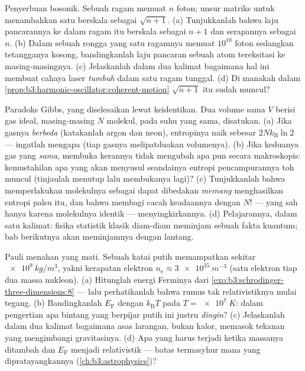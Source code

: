 \begin{exercise}[$\star\star$]\label{exo:b3:identical-particles:9}
Penyerbuan bosonik. Sebuah ragam memuat $n$ foton; unsur matriks untuk
menambahkan satu berskala sebagai $\sqrt{n+1}$. (a) Tunjukkanlah bahwa
laju pancarannya ke dalam ragam itu berskala sebagai $n + 1$ dan
serapannya sebagai $n$. (b) Dalam sebuah rongga yang satu ragamnya
memuat $10^{10}$ foton sedangkan tetangganya kosong, bandingkanlah laju
pancaran sebuah atom tereksitasi ke masing-masingnya. (c) Jelaskanlah
dalam dua kalimat bagaimana hal ini membuat cahaya laser \emph{tumbuh}
dalam satu ragam tunggal. (d) Di manakah dalam
\cref{prop:b3:harmonic-oscillator:coherent-motion} $\sqrt{n+1}$ itu
sudah muncul?
\end{exercise}

\begin{exercise}[$\star\star\star$]\label{exo:b3:identical-particles:10}
Paradoks Gibbs, yang diselesaikan lewat keidentikan. Dua volume sama
$V$ berisi gas ideal, masing-masing $N$ molekul, pada suhu yang sama,
disatukan. (a) Jika gasnya \emph{berbeda} (katakanlah argon dan neon),
entropinya naik sebesar $2Nk_{\text{B}}\ln2$ --- ingatlah mengapa (tiap
gasnya melipatduakan volumenya). (b) Jika keduanya gas yang \emph{sama},
membuka kerannya tidak mengubah apa pun secara makroskopis: kemustahilan
apa yang akan menyusul seandainya entropi pencampurannya toh muncul
(tinjaulah menutup lalu membukanya lagi)? (c) Tunjukkanlah bahwa
memperlakukan molekulnya sebagai dapat dibedakan \emph{memang}
menghasilkan entropi palsu itu, dan bahwa membagi cacah keadaannya
dengan $N!$ --- yang sah hanya karena molekulnya identik ---
menyingkirkannya. (d) Pelajarannya, dalam satu kalimat: fisika statistik
klasik diam-diam meminjam sebuah fakta kuantum; bab berikutnya akan
meminjamnya dengan lantang.
\end{exercise}

\begin{exercise}[$\star\star\star$]\label{exo:b3:identical-particles:11}
Pauli menahan yang mati. Sebuah katai putih memampatkan sekitar
$\qty{e9}{kg/m^3}$, yakni kerapatan elektron $n_{\text{e}} \approx
\qty{3e35}{m^{-3}}$ (satu elektron tiap dua massa nukleon). (a)
Hitunglah energi Ferminya dari
\cref{exo:b3:schrodinger-three-dimensions:8}
--- lalu perhatikanlah bahwa rumus tak relativistiknya mulai tegang. (b)
Bandingkanlah $E_{\text{F}}$ dengan $k_{\text{B}}T$ pada $T = \qty{e7}{K}$:
dalam pengertian apa bintang yang berpijar putih ini justru
\emph{dingin}? (c) Jelaskanlah dalam dua kalimat bagaimana asas
larangan, bukan kalor, memasok tekanan yang mengimbangi gravitasinya.
(d) Apa yang harus terjadi ketika massanya ditambah dan $E_{\text{F}}$
menjadi relativistik --- batas termasyhur mana yang dipratayangkannya
(\cref{ch:b3:astrophysics})?
\end{exercise}

